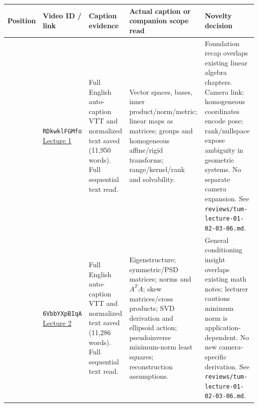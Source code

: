 {\def\LTcaptype{none} %
\begin{longtable}[]{@{}
  >{\raggedright\arraybackslash}p{}
  >{\raggedright\arraybackslash}p{}
  >{\raggedright\arraybackslash}p{}
  >{\raggedright\arraybackslash}p{}
  >{\raggedright\arraybackslash}p{}@{}}
\toprule\noalign{}
\begin{minipage}[b]{\linewidth}\raggedright
Position
\end{minipage} & \begin{minipage}[b]{\linewidth}\raggedright
Video ID / link
\end{minipage} & \begin{minipage}[b]{\linewidth}\raggedright
Caption evidence
\end{minipage} & \begin{minipage}[b]{\linewidth}\raggedright
Actual caption or companion scope read
\end{minipage} & \begin{minipage}[b]{\linewidth}\raggedright
Novelty decision
\end{minipage} \\
\midrule\noalign{}
\endhead
\bottomrule\noalign{}
\endlastfoot
1 & \texttt{RDkwklFGMfo} \href{https://www.youtube.com/watch?v=RDkwklFGMfo}{Lecture 1} & Full English auto-caption VTT and normalized text saved (11,950 words). Full sequential text read. & Vector spaces, bases, inner product/norm/metric; linear maps as matrices; groups and homogeneous affine/rigid transforms; range/kernel/rank and solvability. & Foundation recap overlaps existing linear algebra chapters. Camera link: homogeneous coordinates encode pose; rank/nullspace expose ambiguity in geometric systems. No separate camera expansion. See \texttt{reviews/tum-lecture-01-02-03-06.md}. \\
2 & \texttt{6VbbYXpBIqA} \href{https://www.youtube.com/watch?v=6VbbYXpBIqA}{Lecture 2} & Full English auto-caption VTT and normalized text saved (11,286 words). Full sequential text read. & Eigenstructure; symmetric/PSD matrices; norms and \(A^TA\); skew matrices/cross products; SVD derivation and ellipsoid action; pseudoinverse minimum-norm least squares; reconstruction assumptions. & General conditioning insight overlaps existing math notes; lecturer cautions minimum norm is application-dependent. No new camera-specific derivation. See \texttt{reviews/tum-lecture-01-02-03-06.md}. \\

\end{longtable}}
